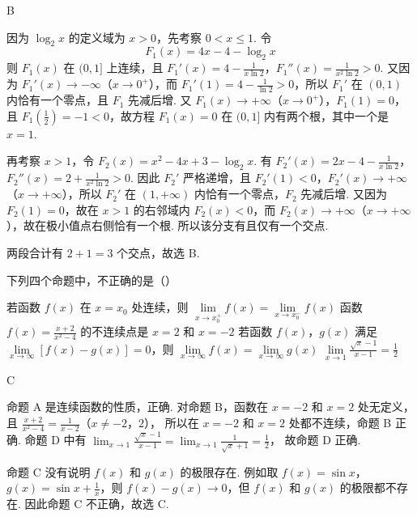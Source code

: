 \begin{answer}
B
\end{answer}

\begin{solution}
因为 \(\log_2x\) 的定义域为 \(x>0\)，先考察 \(0<x\leqslant1\). 令
\[
F_1(x)=4x-4-\log_2x
\]
则 \(F_1(x)\) 在 \((0,1]\) 上连续，且 \(F_1'(x)=4-\frac{1}{x\ln2}\)，\(F_1''(x)=\frac{1}{x^2\ln2}>0\). 又因为 \(F_1'(x)\to-\infty\)（\(x\to0^+\)），而 \(F_1'(1)=4-\frac{1}{\ln2}>0\)，所以 \(F_1'\) 在 \((0,1)\) 内恰有一个零点，且 \(F_1\) 先减后增. 又 \(F_1(x)\to+\infty\)（\(x\to0^+\)），\(F_1(1)=0\)，且 \(F_1\left(\frac12\right)=-1<0\)，故方程 \(F_1(x)=0\) 在 \((0,1]\) 内有两个根，其中一个是 \(x=1\).

再考察 \(x>1\)，令 \(F_2(x)=x^2-4x+3-\log_2x\). 有 \(F_2'(x)=2x-4-\frac{1}{x\ln2}\)，\(F_2''(x)=2+\frac{1}{x^2\ln2}>0\).
因此 \(F_2'\) 严格递增，且 \(F_2'(1)<0\)，\(F_2'(x)\to+\infty\)（\(x\to+\infty\)），所以 \(F_2'\) 在 \((1,+\infty)\) 内恰有一个零点，\(F_2\) 先减后增. 又因为 \(F_2(1)=0\)，故在 \(x>1\) 的右邻域内 \(F_2(x)<0\)，而 \(F_2(x)\to+\infty\)（\(x\to+\infty\)），故在极小值点右侧恰有一个根. 所以该分支有且仅有一个交点.

两段合计有 \(2+1=3\) 个交点，故选 B.
\end{solution}

\begin{problem}
下列四个命题中，不正确的是（\quad）

\choices
    {若函数 \( f(x) \) 在 \( x = x_0 \) 处连续，则 \( \lim\limits_{x \to x_0^+} f(x) = \lim\limits_{x \to x_0^-} f(x) \)}
    {函数 \( f(x) = \frac{x + 2}{x^2 - 4} \) 的不连续点是 \( x = 2 \) 和 \( x = -2 \)}
    {若函数 \(f(x)\)，\(g(x)\) 满足 \( \lim\limits_{x \to \infty} [f(x) - g(x)] = 0 \)，则 \( \lim\limits_{x \to \infty} f(x) = \lim\limits_{x \to \infty} g(x) \)}
    {\(\lim\limits_{x\to 1}\frac{\sqrt{x} - 1}{x - 1} = \frac{1}{2}\)}
\end{problem}

\begin{answer}
C
\end{answer}

\begin{solution}
命题 A 是连续函数的性质，正确. 对命题 B，函数在 \(x=-2\) 和 \(x=2\) 处无定义，且
\(\frac{x+2}{x^2-4}=\frac{1}{x-2}\)（\(x\neq-2\)，\(2\)），
所以在 \(x=-2\) 和 \(x=2\) 处都不连续，命题 B 正确. 命题 D 中有
\(\lim_{x\to1}\frac{\sqrt{x}-1}{x-1}=\lim_{x\to1}\frac{1}{\sqrt{x}+1}=\frac12\)，
故命题 D 正确.

命题 C 没有说明 \(f(x)\) 和 \(g(x)\) 的极限存在. 例如取 \(f(x)=\sin x\)，\(g(x)=\sin x+\frac1x\)，则 \(f(x)-g(x)\to0\)，但 \(f(x)\) 和 \(g(x)\) 的极限都不存在. 因此命题 C 不正确，故选 C.
\end{solution}

